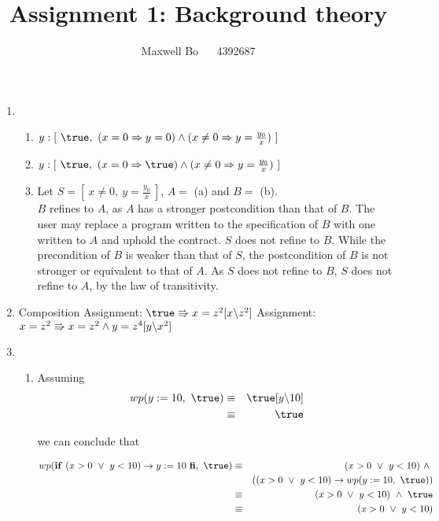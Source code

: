 \documentclass{article}
\title{\bf Assignment 1: Background theory}
\author{Maxwell Bo  ~~ 4392687}
\begin{document}
\maketitle

\begin{enumerate}
\item 
    \begin{enumerate}
    \item $y: [\ \true,\ (x = 0 \Rightarrow y = 0) \land (x \neq 0  \Rightarrow y = \frac{y_0}{x})\ ]$
    \item $y: [\ \true,\ (x = 0 \Rightarrow \true) \land (x \neq 0  \Rightarrow y = \frac{y_0}{x})\ ]$
    \item Let $S = [\ x \neq 0,\ y = \frac{y_0}{x}\ ]$, $A =$ (a) and $B = $ (b).\\ 
    $B$ refines to $A$, as $A$ has a stronger postcondition than that of $B$. The user may replace a program written to the specification of $B$ with one written to $A$ and uphold the contract. $S$ does not refine to $B$. While the precondition of $B$ is weaker than that of $S$, the postcondition of $B$ is not stronger or equivalent to that of $A$. As $S$ does not refine to $B$, $S$ does not refine to $A$, by the law of transitivity. 
    \end{enumerate}

\item 
    \DERIVE
     {Composition}
     {Assignment: $\true \entails x = z^2 [x \backslash z^2]$}
     {Assignment: $x = z^2 \Rrightarrow x = z^2 \land y = z ^ 4[y \backslash x^2]$}
    \ENDDERIVE

\item
    \begin{enumerate}
    \item Assuming
        \begin{eqnarray*}
            wp(y := 10,\ \true) & \equiv & \true[y \backslash 10]\\
                               & \equiv & \true
        \end{eqnarray*} 

        we can conclude that 

        \begin{eqnarray*}
            wp(\If~ (x > 0 ~\lor~ y < 10) \rightarrow y:= 10\ \Fi,\ \true) & \equiv & (x > 0 ~\lor~ y < 10) ~\land~ \\
                & & ((x > 0 ~\lor~ y < 10) \rightarrow wp(y := 10,\ \true))\\
            & \equiv & (x > 0 ~\lor~ y < 10) ~\land~ \true\\
            & \equiv & (x > 0 ~\lor~ y < 10)
        \end{eqnarray*}


\end{enumerate}
\end{enumerate}
\end{document}
